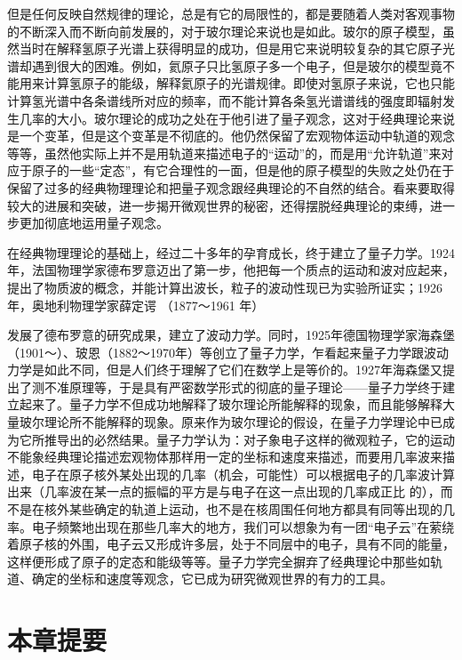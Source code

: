 但是任何反映自然规律的理论，总是有它的局限性的，都是要随着人类对客观事物的不断深入而不断向前发展的，对于玻尔理论来说也是如此。玻尔的原子模型，虽然当时在解释氢原子光谱上获得明显的成功，但是用它来说明较复杂的其它原子光谱却遇到很大的困难。例如，氦原子只比氢原子多一个电子，但是玻尔的模型竟不能用来计算氢原子的能级，解释氦原子的光谱规律。即使对氢原子来说，它也只能计算氢光谱中各条谱线所对应的频率，而不能计算各条氢光谱谱线的强度即辐射发生几率的大小。玻尔理论的成功之处在于他引进了量子观念，这对于经典理论来说是一个变革，但是这个变革是不彻底的。他仍然保留了宏观物体运动中轨道的观念等等，虽然他实际上并不是用轨道来描述电子的``运动''的，而是用``允许轨道''来对应于原子的一些``定态''，有它合理性的一面，但是他的原子模型的失败之处仍在于保留了过多的经典物理理论和把量子观念跟经典理论的不自然的结合。看来要取得较大的进展和突破，进一步揭开微观世界的秘密，还得摆脱经典理论的束缚，进一步更加彻底地运用量子观念。

在经典物理理论的基础上，经过二十多年的孕育成长，终于建立了量子力学。1924
年，法国物理学家德布罗意迈出了第一步，他把每一个质点的运动和波对应起来，提出了物质波的概念，并能计算出波长，粒子的波动性现已为实验所证实；1926
年，奥地利物理学家薛定谔 （1877～1961 年）

发展了德布罗意的研究成果，建立了波动力学。同时，1925年德国物理学家海森堡（1901～）、玻恩（1882～1970年）等创立了量子力学，乍看起来量子力学跟波动力学是如此不同，但是人们终于理解了它们在数学上是等价的。1927年海森堡又提出了测不准原理等，于是具有严密数学形式的彻底的量子理论------量子力学终于建立起来了。量子力学不但成功地解释了玻尔理论所能解释的现象，而且能够解释大量玻尔理论所不能解释的现象。原来作为玻尔理论的假设，在量子力学理论中已成为它所推导出的必然结果。量子力学认为：对子象电子这样的微观粒子，它的运动不能象经典理论描述宏观物体那样用一定的坐标和速度来描述，而要用几率波来描述，电子在原子核外某处出现的几率（机会，可能性）可以根据电子的几率波计算出来（几率波在某一点的振幅的平方是与电子在这一点出现的几率成正比
的），而不是在核外某些确定的轨道上运动，也不是在核周围任何地方都具有同等出现的几率。电子频繁地出现在那些几率大的地方，我们可以想象为有一团``电子云''在萦绕着原子核的外围，电子云又形成许多层，处于不同层中的电子，具有不同的能量，这样便形成了原子的定态和能级等等。量子力学完全摒弃了经典理论中那些如轨道、确定的坐标和速度等观念，它已成为研究微观世界的有力的工具。

\section{本章提要}

